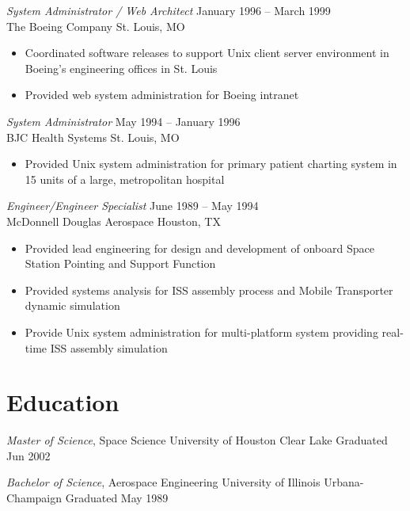 \documentclass[margin,line]{resume}
\begin{document}
\begin{resume}
{\sl System Administrator / Web Architect} \hfill January 1996 -- March 1999\\
The Boeing Company \hfill St. Louis, MO
\begin{itemize} \itemsep -2pt %
\small\item Coordinated software releases to support Unix client server environment in Boeing’s engineering offices in St. Louis
\small\item Provided web system administration for Boeing intranet
\end{itemize}

{\sl System Administrator} \hfill May 1994 -- January 1996\\
BJC Health Systems \hfill St. Louis, MO

\begin{itemize} \itemsep -2pt %
\small\item Provided Unix system administration for primary patient charting system in 15 units of a large, metropolitan hospital
\end{itemize}

{\sl Engineer/Engineer Specialist} \hfill June 1989 -- May 1994\\
McDonnell Douglas Aerospace \hfill Houston, TX
\begin{itemize} \itemsep -2pt %
\small\item Provided lead engineering for design and development of onboard Space Station Pointing and Support Function
\small\item Provided systems analysis for ISS assembly process and Mobile Transporter dynamic simulation
\small\item Provide Unix system administration for multi-platform system providing real-time ISS assembly simulation
\end{itemize}

\section{Education}
{\small
  {\sl Master of Science}, Space Science \hfill
  University of Houston Clear Lake \hfill
  Graduated Jun 2002
}

{\small
  {\sl Bachelor of Science}, Aerospace Engineering \hfill
  University of Illinois Urbana-Champaign \hfill
  Graduated May 1989
}


\end{resume}
\end{document}
